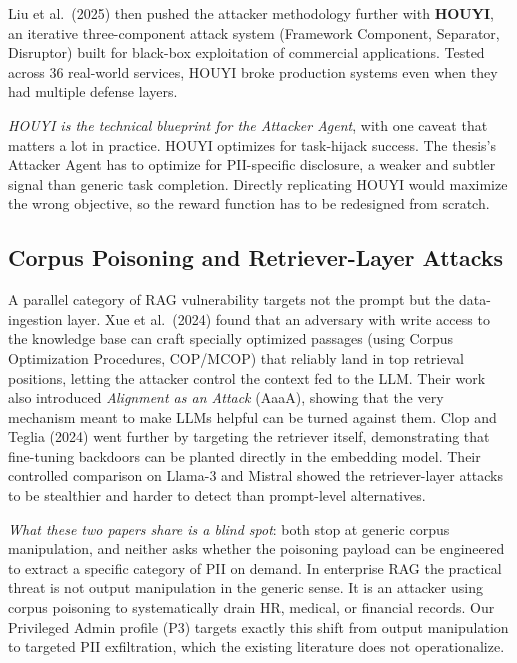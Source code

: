 \documentclass[12pt,a4paper]{report}
\begin{document}
Liu et al.\ (2025) then pushed the attacker methodology further with \textbf{HOUYI}, an iterative three-component attack system (Framework Component, Separator, Disruptor) built for black-box exploitation of commercial applications. Tested across 36 real-world services, HOUYI broke production systems even when they had multiple defense layers.

\begin{critbox}
\textit{HOUYI is the technical blueprint for the Attacker Agent}, with one caveat that matters a lot in practice. HOUYI optimizes for task-hijack success. The thesis's Attacker Agent has to optimize for PII-specific disclosure, a weaker and subtler signal than generic task completion. Directly replicating HOUYI would maximize the wrong objective, so the reward function has to be redesigned from scratch.
\end{critbox}

\subsection{Corpus Poisoning and Retriever-Layer Attacks}

A parallel category of RAG vulnerability targets not the prompt but the data-ingestion layer. Xue et al.\ (2024) found that an adversary with write access to the knowledge base can craft specially optimized passages (using Corpus Optimization Procedures, COP/MCOP) that reliably land in top retrieval positions, letting the attacker control the context fed to the LLM. Their work also introduced \emph{Alignment as an Attack} (AaaA), showing that the very mechanism meant to make LLMs helpful can be turned against them. Clop and Teglia (2024) went further by targeting the retriever itself, demonstrating that fine-tuning backdoors can be planted directly in the embedding model. Their controlled comparison on Llama-3 and Mistral showed the retriever-layer attacks to be stealthier and harder to detect than prompt-level alternatives.

\begin{critbox}
\textit{What these two papers share is a blind spot}: both stop at generic corpus manipulation, and neither asks whether the poisoning payload can be engineered to extract a specific category of PII on demand. In enterprise RAG the practical threat is not output manipulation in the generic sense. It is an attacker using corpus poisoning to systematically drain HR, medical, or financial records. Our Privileged Admin profile (P3) targets exactly this shift from output manipulation to targeted PII exfiltration, which the existing literature does not operationalize.
\end{critbox}
\end{document}
